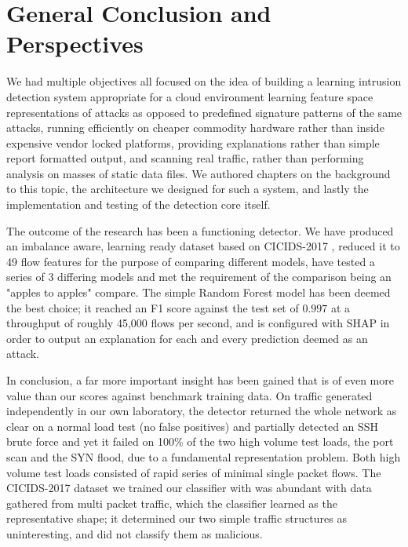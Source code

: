 
\chapter*{General Conclusion and Perspectives}

We had multiple objectives all focused on the idea of building a learning intrusion detection system appropriate for a cloud environment  learning feature space representations of attacks as opposed to predefined signature patterns of the same attacks, running efficiently on cheaper commodity hardware rather than inside expensive vendor locked platforms, providing explanations rather than simple report formatted output, and scanning real traffic, rather than performing analysis on masses of static data files. We authored chapters on the background to this topic, the architecture we designed for such a system, and lastly the implementation and testing of the detection core itself.

The outcome of the research has been a functioning detector. We have produced an imbalance aware, learning ready dataset based on CICIDS-2017 \cite{sharafaldin2018cicids}, reduced it to 49 flow features for the purpose of comparing different models, have tested a series of 3 differing models and met the requirement of the comparison being an "apples to apples" compare. The simple Random Forest model has been deemed the best choice; it reached an F1 score against the test set of $0.997$ at a throughput of roughly 45{,}000 flows per second, and is configured with SHAP \cite{lundberg2017shap} in order to output an explanation for each and every prediction deemed as an attack.

In conclusion, a far more important insight has been gained that is of even more value than our scores against benchmark training data. On traffic generated independently in our own laboratory, the detector returned the whole network as clear on a normal load test (no false positives) and partially detected an SSH brute force    and yet it failed on 100\% of the two high volume test loads, the port scan and the SYN flood, due to a fundamental representation problem. Both high volume test loads consisted of rapid series of minimal single packet flows. The CICIDS-2017 dataset we trained our classifier with was abundant with data gathered from multi packet traffic, which the classifier learned as the representative shape; it determined our two simple traffic structures as uninteresting, and did not classify them as malicious.

